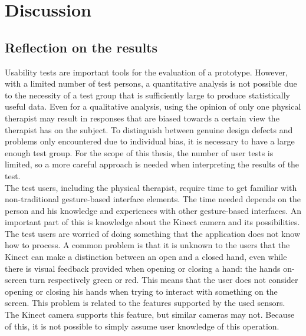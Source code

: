 \chapter{Discussion}


\section{Reflection on the results}

Usability tests are important tools for the evaluation of a prototype. However, with a limited number of test persons, a quantitative analysis is not possible due to the necessity of a test group that is sufficiently large to produce statistically useful data. Even for a qualitative analysis, using the opinion of only one physical therapist may result in responses that are biased towards a certain view the therapist has on the subject. To distinguish between genuine design defects and problems only encountered due to individual bias, it is necessary to have a large enough test group. For the scope of this thesis, the number of user tests is limited, so a more careful approach is needed when interpreting the results of the test.\\

The test users, including the physical therapist, require time to get familiar with non-traditional gesture-based interface elements. The time needed depends on the person and his knowledge and experiences with other gesture-based interfaces. An important part of this is knowledge about the Kinect camera and its possibilities. The test users are worried of doing something that the application does not know how to process. A common problem is that it is unknown to the users that the Kinect can make a distinction between an open and a closed hand, even while there is visual feedback provided when opening or closing a hand: the hands on-screen turn respectively green or red. This means that the user does not consider opening or closing his hands when trying to interact with something on the screen. This problem is related to the features supported by the used sensors. The Kinect camera supports this feature, but similar cameras may not. Because of this, it is not possible to simply assume user knowledge of this operation.\\

